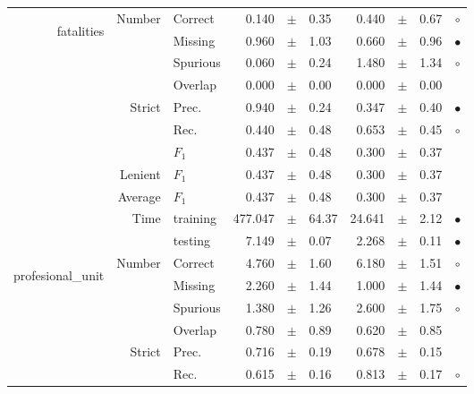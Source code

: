 \begin{longtable}{|r|r|l||rcl|rcl|c|}
\hline
\hline
\multirow{11}{*}{\begin{sideways}fatalities\end{sideways} } & \multirow{4}{*}{Number} &  Correct  & 0.140 &  $\pm$  & 0.35 & 0.440 &  $\pm$  & 0.67 &  $\circ$\\
\cline{3-10}
  &  &  Missing  & 0.960 &  $\pm$  & 1.03 & 0.660 &  $\pm$  & 0.96 &  $\bullet$\\
\cline{3-10}
  &  &  Spurious  & 0.060 &  $\pm$  & 0.24 & 1.480 &  $\pm$  & 1.34 &  $\circ$\\
\cline{3-10}
  &  &  Overlap  & 0.000 &  $\pm$  & 0.00 & 0.000 &  $\pm$  & 0.00 &   \\
\cline{2-10}
  & \multirow{3}{*}{Strict} &  Prec.  & 0.940 &  $\pm$  & 0.24 & 0.347 &  $\pm$  & 0.40 &  $\bullet$\\
\cline{3-10}
  &  &  Rec.  & 0.440 &  $\pm$  & 0.48 & 0.653 &  $\pm$  & 0.45 &  $\circ$\\
\cline{3-10}
  &  &  $F_1$  & 0.437 &  $\pm$  & 0.48 & 0.300 &  $\pm$  & 0.37 &   \\
\cline{2-10}
  & Lenient &  $F_1$  & 0.437 &  $\pm$  & 0.48 & 0.300 &  $\pm$  & 0.37 &   \\
\cline{2-10}
  & Average &  $F_1$  & 0.437 &  $\pm$  & 0.48 & 0.300 &  $\pm$  & 0.37 &   \\
\cline{2-10}
  & \multirow{2}{*}{Time} &  training  & 477.047 &  $\pm$  & 64.37 & 24.641 &  $\pm$  & 2.12 &  $\bullet$\\
\cline{3-10}
  &  &  testing  & 7.149 &  $\pm$  & 0.07 & 2.268 &  $\pm$  & 0.11 &  $\bullet$\\
\hline
\hline
\multirow{11}{*}{\begin{sideways}profesional\_unit\end{sideways} } & \multirow{4}{*}{Number} &  Correct  & 4.760 &  $\pm$  & 1.60 & 6.180 &  $\pm$  & 1.51 &  $\circ$\\
\cline{3-10}
  &  &  Missing  & 2.260 &  $\pm$  & 1.44 & 1.000 &  $\pm$  & 1.44 &  $\bullet$\\
\cline{3-10}
  &  &  Spurious  & 1.380 &  $\pm$  & 1.26 & 2.600 &  $\pm$  & 1.75 &  $\circ$\\
\cline{3-10}
  &  &  Overlap  & 0.780 &  $\pm$  & 0.89 & 0.620 &  $\pm$  & 0.85 &   \\
\cline{2-10}
  & \multirow{3}{*}{Strict} &  Prec.  & 0.716 &  $\pm$  & 0.19 & 0.678 &  $\pm$  & 0.15 &   \\
\cline{3-10}
  &  &  Rec.  & 0.615 &  $\pm$  & 0.16 & 0.813 &  $\pm$  & 0.17 &  $\circ$\\

\end{longtable}
